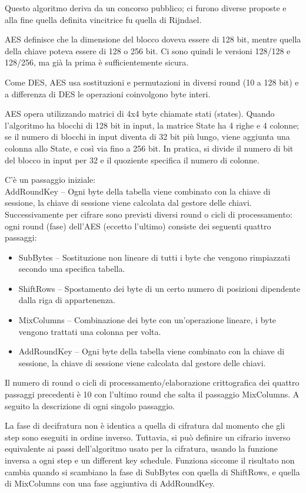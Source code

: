 Questo algoritmo deriva da un concorso pubblico;
ci furono diverse proposte e alla fine quella definita vincitrice fu quella di Rijndael.

AES definisce che la dimensione del blocco doveva essere di 128 bit, mentre quella della chiave poteva essere di 128 o 256 bit.
Ci sono quindi le versioni 128/128 e 128/256, ma già la prima è sufficientemente sicura.

Come DES, AES usa sostituzioni e permutazioni in diversi round (10 a 128 bit) e a differenza di DES le operazioni coinvolgono byte interi.

AES opera utilizzando matrici di 4x4 byte chiamate stati (states). Quando l'algoritmo ha blocchi di 128 bit in input, la matrice State ha 4 righe e 4 colonne; se il numero di blocchi in input diventa di 32 bit più lungo, viene aggiunta una colonna allo State, e così via fino a 256 bit. In pratica, si divide il numero di bit del blocco in input per 32 e il quoziente specifica il numero di colonne.

C'è un passaggio iniziale:\\
AddRoundKey – Ogni byte della tabella viene combinato con la chiave di sessione, la chiave di sessione viene calcolata dal gestore delle chiavi.
Successivamente per cifrare sono previsti diversi round o cicli di processamento: ogni round (fase) dell'AES (eccetto l'ultimo) consiste dei seguenti quattro passaggi:
\begin{itemize}
\item SubBytes – Sostituzione non lineare di tutti i byte che vengono rimpiazzati secondo una specifica tabella.
\item ShiftRows – Spostamento dei byte di un certo numero di posizioni dipendente dalla riga di appartenenza.
\item MixColumns – Combinazione dei byte con un'operazione lineare, i byte vengono trattati una colonna per volta.
\item AddRoundKey – Ogni byte della tabella viene combinato con la chiave di sessione, la chiave di sessione viene calcolata dal gestore delle chiavi.
\end{itemize}

Il numero di round o cicli di processamento/elaborazione crittografica dei quattro passaggi precedenti è 10 con l'ultimo round che salta il passaggio MixColumns. A seguito la descrizione di ogni singolo passaggio.

La fase di decifratura non è identica a quella di cifratura dal momento che gli step sono eseguiti in ordine inverso. Tuttavia, si può definire un cifrario inverso equivalente ai passi dell'algoritmo usato per la cifratura, usando la funzione inversa a ogni step e un different key schedule. Funziona siccome il risultato non cambia quando si scambiano la fase di SubBytes con quella di ShiftRows, e quella di MixColumns con una fase aggiuntiva di AddRoundKey.

